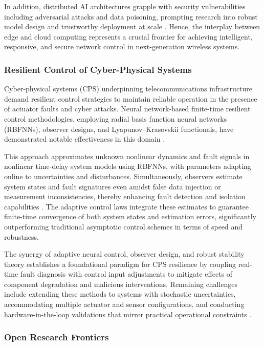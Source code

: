 \documentclass[sigconf]{acmart}
\begin{document}
In addition, distributed AI architectures grapple with security vulnerabilities including adversarial attacks and data poisoning, prompting research into robust model design and trustworthy deployment at scale \cite{ref49,ref50}. Hence, the interplay between edge and cloud computing represents a crucial frontier for achieving intelligent, responsive, and secure network control in next-generation wireless systems.

\subsubsection{Resilient Control of Cyber-Physical Systems}

Cyber-physical systems (CPS) underpinning telecommunications infrastructure demand resilient control strategies to maintain reliable operation in the presence of actuator faults and cyber attacks. Neural network-based finite-time resilient control methodologies, employing radial basis function neural networks (RBFNNs), observer designs, and Lyapunov--Krasovskii functionals, have demonstrated notable effectiveness in this domain \cite{ref46}.

This approach approximates unknown nonlinear dynamics and fault signals in nonlinear time-delay system models using RBFNNs, with parameters adapting online to uncertainties and disturbances. Simultaneously, observers estimate system states and fault signatures even amidst false data injection or measurement inconsistencies, thereby enhancing fault detection and isolation capabilities \cite{ref46}. The adaptive control laws integrate these estimates to guarantee finite-time convergence of both system states and estimation errors, significantly outperforming traditional asymptotic control schemes in terms of speed and robustness.

The synergy of adaptive neural control, observer design, and robust stability theory establishes a foundational paradigm for CPS resilience by coupling real-time fault diagnosis with control input adjustments to mitigate effects of component degradation and malicious interventions. Remaining challenges include extending these methods to systems with stochastic uncertainties, accommodating multiple actuator and sensor configurations, and conducting hardware-in-the-loop validations that mirror practical operational constraints \cite{ref46}.

\subsubsection{Open Research Frontiers}
\end{document}
